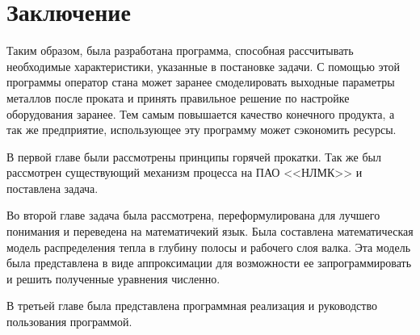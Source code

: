 \newpage

\section*{Заключение} 

Таким образом, была разработана программа, способная рассчитывать необходимые характеристики, указанные в постановке задачи. С помощью этой программы оператор стана может заранее смоделировать выходные параметры металлов после проката и принять правильное решение по настройке оборудования заранее. Тем самым  повышается качество конечного продукта, а так же предприятие, использующее эту программу может сэкономить ресурсы.

В первой главе были рассмотрены принципы горячей прокатки. Так же был рассмотрен существующий механизм процесса на ПАО <<НЛМК>> и поставлена задача.

Во второй главе задача была рассмотрена, переформулирована для лучшего понимания и переведена на математичекий язык. Была составлена математическая модель распределения тепла в глубину полосы и  рабочего слоя валка. Эта модель была представлена в виде аппроксимации для возможности ее запрограммировать и решить полученные уравнения численно.

В третьей главе была представлена программная реализация и руководство пользования программой.